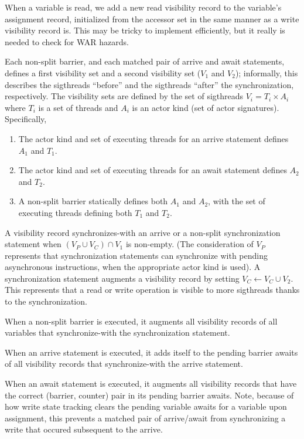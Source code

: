 \filbreak
{} When a variable is read, we add a new read visibility record to the variable's assignment record, initialized from the accessor set in the same manner as a write visibility record is.
This may be tricky to implement efficiently, but it really is needed to check for WAR hazards.

\filbreak
{} Each non-split barrier, and each matched pair of arrive and await statements, defines a first visibility set and a second visibility set ($V_1$ and $V_2$); informally, this describes the sigthreads ``before'' and the sigthreads ``after'' the synchronization, respectively.
The visibility sets are defined by the set of sigthreads $V_i = T_i \times A_i$ where $T_i$ is a set of threads and $A_i$ is an actor kind (set of actor signatures).
Specifically,

\filbreak
\begin{enumerate}
  \item The actor kind and set of executing threads for an arrive statement defines $A_1$ and $T_1$.
  \item The actor kind and set of executing threads for an await statement defines $A_2$ and $T_2$.
  \item A non-split barrier statically defines both $A_1$ and $A_2$, with the set of executing threads defining both $T_1$ and $T_2$.
\end{enumerate}

\filbreak
A visibility record synchronizes-with an arrive or a non-split synchronization statement when ${(V_P \cup V_C) \cap V_1}$ is non-empty.
(The consideration of $V_P$ represents that synchronization statements can synchronize with pending asynchronous instructions, when the appropriate actor kind is used).
A synchronization statement augments a visibility record by setting ${V_C \leftarrow V_C \cup V_2}$.
This represents that a read or write operation is visible to more sigthreads thanks to the synchronization.

\filbreak
When a non-split barrier is executed, it augments all visibility records of all variables that synchronize-with the synchronization statement.

\filbreak
When an arrive statement is executed, it adds itself to the pending barrier awaits of all visibility records that synchronize-with the arrive statement.

\filbreak
When an await statement is executed, it augments all visibility records that have the correct (barrier, counter) pair in its pending barrier awaits.
Note, because of how write state tracking clears the pending variable awaits for a variable upon assignment, this prevents a matched pair of arrive/await from synchronizing a write that occured subsequent to the arrive.

